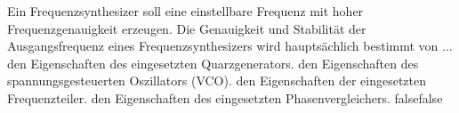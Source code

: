     {Ein Frequenzsynthesizer soll eine einstellbare Frequenz mit hoher Frequenzgenauigkeit erzeugen. Die Genauigkeit und Stabilität der Ausgangsfrequenz eines Frequenzsynthesizers wird hauptsächlich bestimmt von ...}
    {den Eigenschaften des eingesetzten Quarzgenerators.}
    {den Eigenschaften des spannungsgesteuerten Oszillators (VCO).}
    {den Eigenschaften der eingesetzten Frequenzteiler.}
    {den Eigenschaften des eingesetzten Phasenvergleichers.}
    {false}{false}